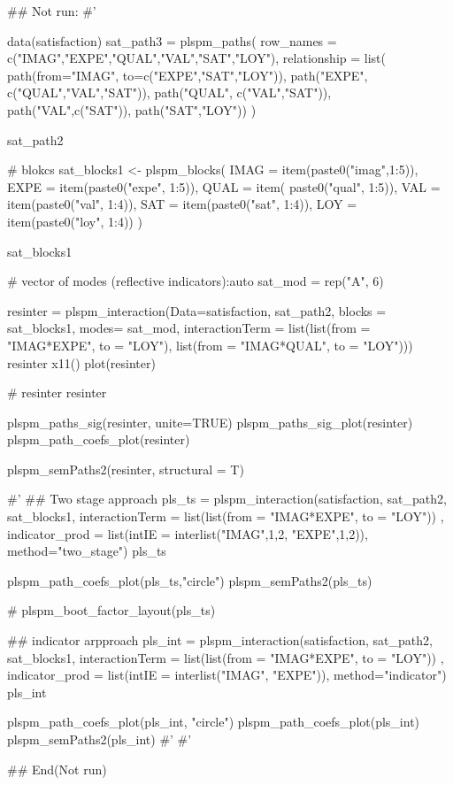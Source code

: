 \documentclass[a4paper]{book}
\begin{document}
\begin{Examples}
\begin{ExampleCode}


\#\# Not run: 
#'

data(satisfaction)
sat_path3 = plspm_paths(
  row_names = c("IMAG","EXPE","QUAL","VAL","SAT","LOY"),
  relationship = list(
    path(from="IMAG", to=c("EXPE","SAT","LOY")),
    path("EXPE", c("QUAL","VAL","SAT")),
    path("QUAL", c("VAL","SAT")),
    path("VAL",c("SAT")),
    path("SAT","LOY"))
)

sat_path2

# blokcs
sat_blocks1 <- plspm_blocks(
  IMAG = item(paste0("imag",1:5)),
  EXPE = item(paste0("expe", 1:5)),
  QUAL = item( paste0("qual", 1:5)),
  VAL = item(paste0("val", 1:4)),
  SAT = item(paste0("sat", 1:4)),
  LOY = item(paste0("loy", 1:4))
)

sat_blocks1

# vector of modes (reflective indicators):auto
sat_mod = rep("A", 6)

resinter = plspm_interaction(Data=satisfaction,
                     sat_path2, blocks = sat_blocks1, modes= sat_mod,
                     interactionTerm = list(list(from = "IMAG*EXPE", to = "LOY"),
                     list(from = "IMAG*QUAL", to = "LOY")))
resinter%
x11()
plot(resinter)

# resinter %
resinter %

plspm_paths_sig(resinter, unite=TRUE)
plspm_paths_sig_plot(resinter)
plspm_path_coefs_plot(resinter)

plspm_semPaths2(resinter, structural = T)


#'
## Two stage approach
pls_ts = plspm_interaction(satisfaction, sat_path2, sat_blocks1,
               interactionTerm = list(list(from = "IMAG*EXPE", to = "LOY")) ,
               indicator_prod = list(intIE = interlist("IMAG",1,2, "EXPE",1,2)),
               method="two_stage")
pls_ts %


plspm_path_coefs_plot(pls_ts,"circle")
plspm_semPaths2(pls_ts)

# plspm_boot_factor_layout(pls_ts)

## indicator arpproach
pls_int = plspm_interaction(satisfaction, sat_path2, sat_blocks1,
                  interactionTerm = list(list(from = "IMAG*EXPE", to = "LOY")) ,
                indicator_prod = list(intIE = interlist("IMAG", "EXPE")),
                  method="indicator")
pls_int %


plspm_path_coefs_plot(pls_int, "circle")
plspm_path_coefs_plot(pls_int)
plspm_semPaths2(pls_int)
#'
#'



## End(Not run)


\end{ExampleCode}
\end{Examples}
\end{document}
